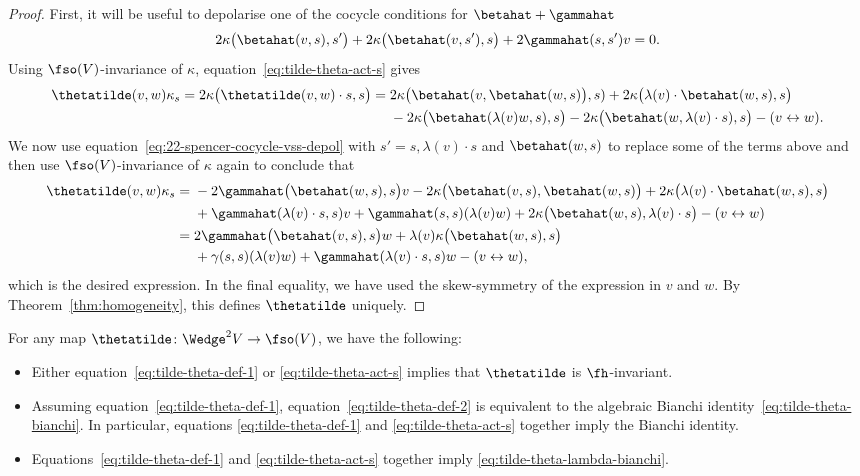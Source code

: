 \begin{proof}
	First, it will be useful to depolarise one of the cocycle conditions for $\betahat+\gammahat$
	\begin{equation}\label{eq:22-spencer-cocycle-vss-depol}
		2\kappa\bigl(\betahat(v,s),s'\bigr) + 2\kappa\bigl(\betahat(v,s'),s\bigr) + 2\gammahat(s,s')v = 0.
	\end{equation}
	Using $\fso(V)$-invariance of $\kappa$, equation~\eqref{eq:tilde-theta-act-s} gives
	\begin{align*}
		\thetatilde(v,w)\kappa_s
		= 2\kappa\bigl(\thetatilde(v,w)\cdot s,s\bigr)
		={}& 2\kappa\bigl(\betahat(v,\betahat(w,s)\bigr),s)
			+ 2\kappa\bigl(\lambda(v)\cdot\betahat(w,s),s\bigr)\\
			& - 2\kappa\bigl(\betahat(\lambda(v)w,s),s\bigr)
			- 2\kappa\bigl(\betahat(w,\lambda(v)\cdot s),s\bigr)
			- (v \leftrightarrow w).
	\end{align*}
	We now use equation~\eqref{eq:22-spencer-cocycle-vss-depol} with $s'=s,\lambda(v)\cdot s$ and $\betahat(w,s) $ to replace some of the terms above and then use $\fso(V)$-invariance of $\kappa$ again to conclude that
	\begin{align*}
		\thetatilde(v,w)\kappa_s
		={}& - 2\gammahat\bigl(\betahat(w,s),s\bigr)v
			- 2\kappa\bigl(\betahat(v,s),\betahat(w,s)\bigr) + 2\kappa\bigl(\lambda(v)\cdot\betahat(w,s),s\bigr)
\\
			&+ \gammahat(\lambda(v)\cdot s,s)v + \gammahat(s,s)(\lambda(v)w)
			+ 2\kappa\bigl(\betahat(w,s),\lambda(v)\cdot s\bigr)
			- (v \leftrightarrow w)\\
		={}&2\gammahat\bigl(\betahat(v,s),s\bigr)w
			+ \lambda(v)\kappa\bigl(\betahat(w,s),s\bigr)\\
			& + \gamma(s,s)(\lambda(v)w)
			+ \gammahat(\lambda(v)\cdot s,s)w - (v \leftrightarrow w),
	\end{align*}
	which is the desired expression. In the final equality, we have used the skew-symmetry of the expression in $v$ and $w$. By Theorem~\ref{thm:homogeneity}, this defines $\thetatilde$ uniquely.
\end{proof}

\begin{Lemma}\label{lemma:quadr-jacobi-dependency}
	For any map $\thetatilde\colon\Wedge^2 V\to\fso(V)$, we have the following:
	\begin{itemize}\itemsep=0pt
		\item Either equation~\eqref{eq:tilde-theta-def-1} or \eqref{eq:tilde-theta-act-s} implies that $\thetatilde$ is $\fh$-invariant.
		\item Assuming equation~\eqref{eq:tilde-theta-def-1}, equation~\eqref{eq:tilde-theta-def-2} is equivalent to the algebraic Bianchi identity~\eqref{eq:tilde-theta-bianchi}. In particular, equations \eqref{eq:tilde-theta-def-1} and \eqref{eq:tilde-theta-act-s} together imply the Bianchi identity.
		\item Equations~\eqref{eq:tilde-theta-def-1} and \eqref{eq:tilde-theta-act-s} together imply \eqref{eq:tilde-theta-lambda-bianchi}.
	\end{itemize}
\end{Lemma}

